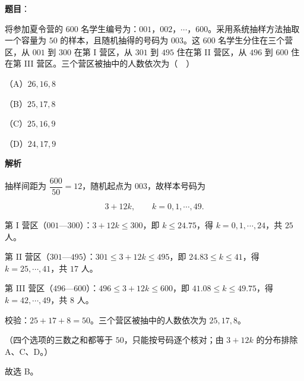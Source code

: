 \begin{answer}

\textbf{题目}：

将参加夏令营的 $600$ 名学生编号为：$001$，$002$，$\cdots$，$600$。采用系统抽样方法抽取一个容量为 $50$ 的样本，且随机抽得的号码为 $003$。这 $600$ 名学生分住在三个营区，从 $001$ 到 $300$ 在第 I 营区，从 $301$ 到 $495$ 住在第 II 营区，从 $496$ 到 $600$ 住在第 III 营区。三个营区被抽中的人数依次为（　）

（A）$26,16,8$

（B）$25,17,8$

（C）$25,16,9$

（D）$24,17,9$

\textbf{解析}

抽样间距为 $\dfrac{600}{50}=12$，随机起点为 $003$，故样本号码为

\nopagebreak[4]
\[3+12k,\qquad k=0,1,\cdots,49.\]

第 I 营区（$001$—$300$）：$3+12k\leqslant300$，即 $k\leqslant24.75$，得 $k=0,1,\cdots,24$，共 $25$ 人。

第 II 营区（$301$—$495$）：$301\leqslant3+12k\leqslant495$，即 $24.83\leqslant k\leqslant41$，得 $k=25,\cdots,41$，共 $17$ 人。

第 III 营区（$496$—$600$）：$496\leqslant3+12k\leqslant600$，即 $41.08\leqslant k\leqslant49.75$，得 $k=42,\cdots,49$，共 $8$ 人。

校验：$25+17+8=50$。三个营区被抽中的人数依次为 $25,17,8$。

（四个选项的三数之和都等于 $50$，只能按号码逐个核对；由 $3+12k$ 的分布排除 A、C、D。）

故选 B。


\end{answer}
